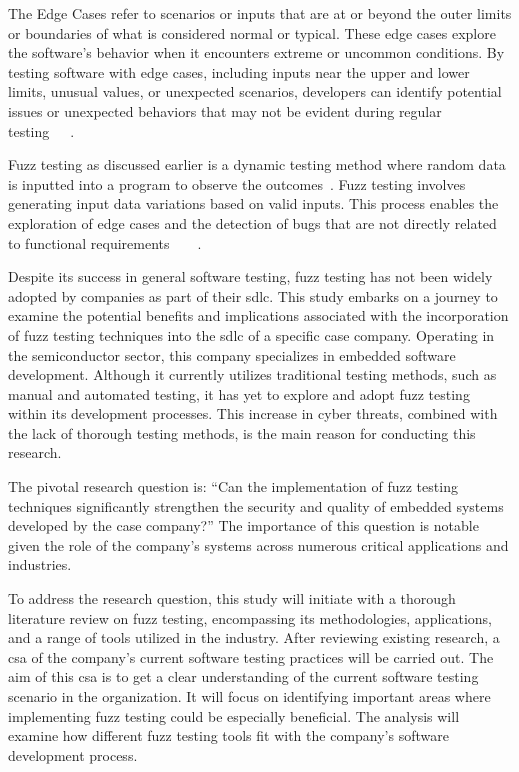 The \gls{Edge Cases} refer to scenarios or inputs that are at or beyond the outer limits or boundaries
of what is considered normal or typical. These edge cases explore the software's behavior when
it encounters extreme or uncommon conditions. By testing software with edge cases, including
inputs near the upper and lower limits, unusual values, or unexpected scenarios, developers
can identify potential issues or unexpected behaviors that may not be evident
during regular testing~\cite{deng2023large}~\cite{cunningham2019software}~\cite{koopman2016challenges}.

Fuzz testing as discussed earlier is a dynamic testing method where random
data is inputted into a program to observe the outcomes~\cite{felderer2016security}\cite{yun2022fuzzing}.
Fuzz testing involves generating input data variations based on valid inputs.
This process enables the exploration of edge cases and the detection of bugs that are not directly
related to
functional requirements~\cite{eisele2022debugger}~\cite{fowler2018fuzz}~\cite{deng2023large}~\cite{eisele2022embedded}.

Despite its success in general software testing, fuzz testing has not been widely adopted by
companies as part of their \gls{sdlc}\cite{liang2018fuzz}.
This study embarks on a journey to examine the potential benefits and implications
associated with the incorporation of fuzz testing techniques into the \acrshort{sdlc}
of a specific case company. Operating in the semiconductor sector,
this company specializes in embedded software development. Although it currently
utilizes traditional testing methods, such as manual and automated testing, it
has yet to explore and adopt fuzz testing within its development processes.
This increase in cyber threats, combined with the lack of thorough testing
methods, is the main reason for conducting this research.

The pivotal research question is: ``Can the implementation of fuzz testing
techniques significantly strengthen the security and quality of embedded systems
developed by the case company?'' The importance of this question is notable given the
role of the company's systems across numerous critical applications and industries.

To address the research question, this study will initiate with a thorough
literature review on fuzz testing, encompassing its methodologies, applications,
and a range of tools utilized in the industry.
After reviewing existing research, a \gls{csa} of the
company's current software testing practices will be carried out. The aim of this \acrshort{csa}
is to get a clear understanding of the current software testing scenario in the organization.
It will focus on identifying important areas where
implementing fuzz testing could be especially beneficial.
The analysis will examine how different fuzz testing tools fit with the
company's software development process.


